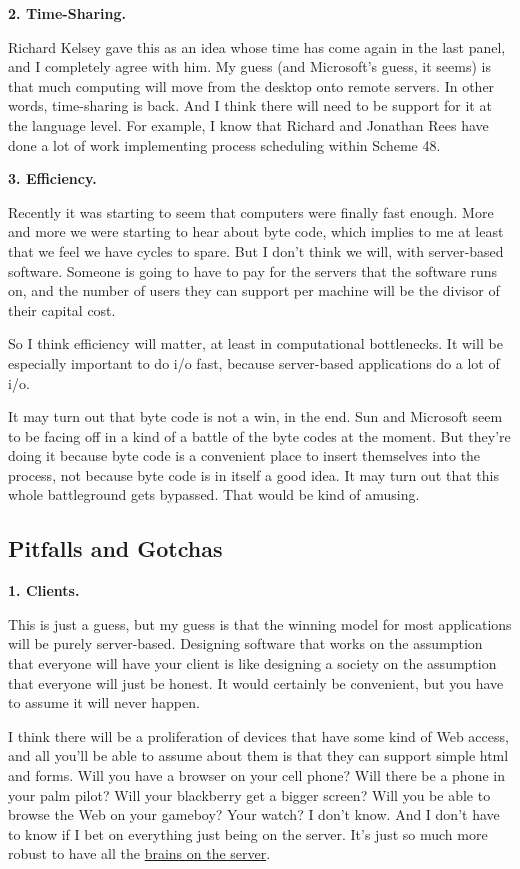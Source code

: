 \documentclass[12pt]{book}
\begin{document}
\textbf{2. Time-Sharing.}

Richard Kelsey gave this as an idea whose time has come again in the
last panel, and I completely agree with him. My guess (and Microsoft's
guess, it seems) is that much computing will move from the desktop onto
remote servers. In other words, time-sharing is back. And I think there
will need to be support for it at the language level. For example, I
know that Richard and Jonathan Rees have done a lot of work implementing
process scheduling within Scheme 48.

\textbf{3. Efficiency.}

Recently it was starting to seem that computers were finally fast
enough. More and more we were starting to hear about byte code, which
implies to me at least that we feel we have cycles to spare. But I don't
think we will, with server-based software. Someone is going to have to
pay for the servers that the software runs on, and the number of users
they can support per machine will be the divisor of their capital cost.

So I think efficiency will matter, at least in computational
bottlenecks. It will be especially important to do i/o fast, because
server-based applications do a lot of i/o.

It may turn out that byte code is not a win, in the end. Sun and
Microsoft seem to be facing off in a kind of a battle of the byte codes
at the moment. But they're doing it because byte code is a convenient
place to insert themselves into the process, not because byte code is in
itself a good idea. It may turn out that this whole battleground gets
bypassed. That would be kind of amusing.

\subsection{Pitfalls and Gotchas}\label{pitfalls-and-gotchas}

\textbf{1. Clients.}

This is just a guess, but my guess is that the winning model for most
applications will be purely server-based. Designing software that works
on the assumption that everyone will have your client is like designing
a society on the assumption that everyone will just be honest. It would
certainly be convenient, but you have to assume it will never happen.

I think there will be a proliferation of devices that have some kind of
Web access, and all you'll be able to assume about them is that they can
support simple html and forms. Will you have a browser on your cell
phone? Will there be a phone in your palm pilot? Will your blackberry
get a bigger screen? Will you be able to browse the Web on your gameboy?
Your watch? I don't know. And I don't have to know if I bet on
everything just being on the server. It's just so much more robust to
have all the \href{road.html}{brains on the server}.
\end{document}
